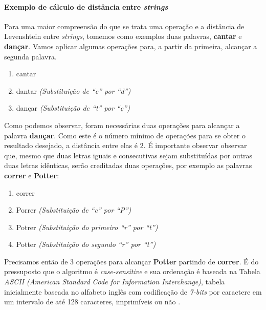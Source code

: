\paragraph*{Exemplo de cálculo de distância entre \textit{strings}} %
\label{sub:exemplo_de_c_lculo_de_distancia_entre_it}

Para uma maior compreensão do que se trata uma operação e a distância de Levenshtein entre \textit{strings}, tomemos como exemplos duas palavras, \textbf{cantar} e \textbf{dançar}. Vamos aplicar algumas operações para, a partir da primeira, alcançar a segunda palavra.


\begin{enumerate}[start=0]
	\item cantar
	\item dantar \textit{(Substituição de ``c'' por ``d'')}
	\item dançar \textit{(Substituição de ``t'' por ``ç'')}
\end{enumerate}

Como podemos observar, foram necessárias duas operações para alcançar a palavra \textbf{dançar}. Como este é o número mínimo de operações para se obter o resultado desejado, a distância entre elas é $2$.
É importante observar observar que, mesmo que duas letras iguais e consecutivas sejam substituídas por outras duas letras idênticas, serão creditadas duas operações, por exemplo as palavras \textbf{correr} e \textbf{Potter}:

\begin{enumerate}[start=0]
	\item correr
	\item Porrer \textit{(Substituição de ``c'' por ``P'')}
	\item Potrer \textit{(Substituição do primeiro ``r'' por ``t'')}
	\item Potter \textit{(Substituição do segundo ``r'' por ``t'')}
\end{enumerate}

Precisamos então de 3 operações para alcançar \textbf{Potter} partindo de \textbf{correr}. É do pressuposto que o algoritmo é \textit{case-sensitive} e sua ordenação é baseada na Tabela \textit{ASCII (American Standard Code for Information Interchange)}, tabela inicialmente baseada no alfabeto inglês com codificação de \textit{7-bits} por caractere em um intervalo de até 128 caracteres, imprimíveis ou não \cite{shirey2007rfc}.


